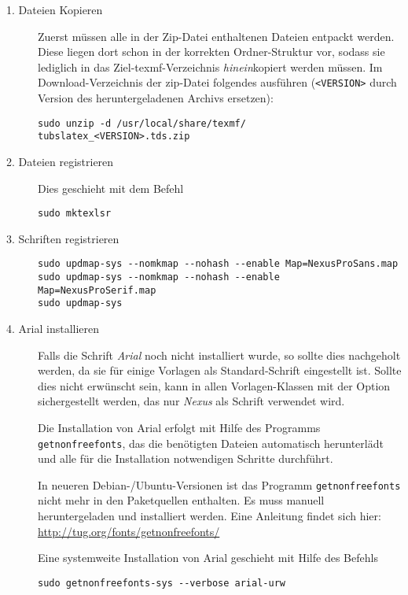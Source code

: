 \begin{description}
  \item[1. Dateien Kopieren] Zuerst müssen alle in der Zip-Datei enthaltenen
    Dateien entpackt werden.
    Diese liegen dort schon in der korrekten Ordner-Struktur vor, sodass
    sie lediglich in das Ziel-texmf-Verzeichnis \emph{hinein}kopiert werden
    müssen.
    Im Download-Verzeichnis der zip-Datei folgendes ausführen
    (\lstinline{<VERSION>} durch Version des heruntergeladenen Archivs ersetzen):
    \begin{lstlisting}[style=cmd]
sudo unzip -d /usr/local/share/texmf/ tubslatex_<VERSION>.tds.zip
    \end{lstlisting}

  \item[2. Dateien registrieren]
    Dies geschieht mit dem Befehl
    \begin{lstlisting}[style=cmd]
sudo mktexlsr
    \end{lstlisting}

  \item[3. Schriften registrieren]\hfill

    \begin{lstlisting}[style=cmd]
sudo updmap-sys --nomkmap --nohash --enable Map=NexusProSans.map
sudo updmap-sys --nomkmap --nohash --enable Map=NexusProSerif.map
sudo updmap-sys
    \end{lstlisting}
    
  \item[4. Arial installieren]
    Falls die Schrift \emph{Arial} noch nicht installiert wurde, so sollte dies
    nachgeholt werden, da sie für einige Vorlagen als Standard-Schrift
    eingestellt ist. Sollte dies nicht erwünscht sein, kann in allen
    Vorlagen-Klassen mit der Option  sichergestellt werden,
    das nur \emph{Nexus} als Schrift verwendet wird.
    
    Die Installation von Arial erfolgt mit Hilfe des Programms
    \lstinline{getnonfreefonts}, das die benötigten Dateien automatisch
    herunterlädt und alle für die Installation notwendigen Schritte durchführt.
    \begin{hint}
      In neueren Debian-/Ubuntu-Versionen ist das Programm \texttt{getnonfreefonts}
      nicht mehr in den Paketquellen enthalten.
      Es muss manuell heruntergeladen und installiert werden.
      Eine Anleitung findet sich hier:
      \url{http://tug.org/fonts/getnonfreefonts/}
    \end{hint}

    
    Eine systemweite Installation von Arial geschieht mit Hilfe des Befehls
    \begin{lstlisting}[style=cmd]
sudo getnonfreefonts-sys --verbose arial-urw
    \end{lstlisting}
    
\end{description}

